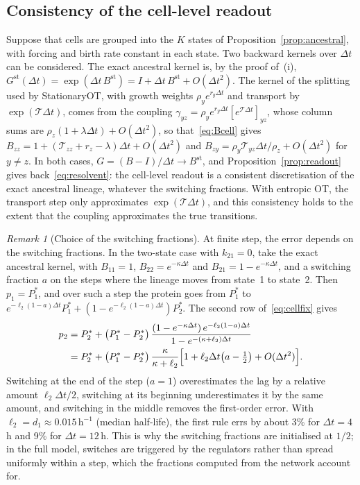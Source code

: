 \documentclass[a4paper, 11pt]{article}
\newcommand{\Tg}{\mathcal{T}}
\theoremstyle{plain}
\theoremstyle{remark}
\newtheorem{rem}{Remark}
\begin{document}
\subsection{Consistency of the cell-level readout}\label{sup:consistency}

Suppose that cells are grouped into the $K$ states of Proposition~\ref{prop:ancestral}, with forcing and birth rate constant in each state. Two backward kernels over $\Delta t$ can be considered. The exact ancestral kernel is, by the proof of~(i), $G^{\mathrm{st}}(\Delta t) = \exp(\Delta t\,B^{\mathrm{st}}) = I + \Delta t\,B^{\mathrm{st}} + O(\Delta t^2)$. The kernel of the splitting used by StationaryOT, with growth weights $\rho_y e^{r_y\Delta t}$ and transport by $\exp(\Tg\Delta t)$, comes from the coupling $\gamma_{yz} = \rho_y e^{r_y\Delta t}[e^{\Tg\Delta t}]_{yz}$, whose column sums are $\rho_z(1 + \lambda\Delta t) + O(\Delta t^2)$, so that~\eqref{eq:Bcell} gives $B_{zz} = 1 + (\Tg_{zz} + r_z - \lambda)\Delta t + O(\Delta t^2)$ and $B_{zy} = \rho_y\Tg_{yz}\Delta t/\rho_z + O(\Delta t^2)$ for $y \neq z$. In both cases, $G = (B - I)/\Delta t \to B^{\mathrm{st}}$, and Proposition~\ref{prop:readout} gives back~\eqref{eq:resolvent}: the cell-level readout is a consistent discretisation of the exact ancestral lineage, whatever the switching fractions. With entropic OT, the transport step only approximates $\exp(\Tg\Delta t)$, and this consistency holds to the extent that the coupling approximates the true transitions.

\begin{rem}[Choice of the switching fractions]\label{rem:switch}
At finite step, the error depends on the switching fractions. In the two-state case with $k_{21} = 0$, take the exact ancestral kernel, with $B_{11} = 1$, $B_{22} = e^{-\kappa\Delta t}$ and $B_{21} = 1 - e^{-\kappa\Delta t}$, and a switching fraction $a$ on the steps where the lineage moves from state~1 to state~2. Then $p_1 = P^\ast_1$, and over such a step the protein goes from $P^\ast_1$ to $e^{-\ell_2(1-a)\Delta t}P^\ast_1 + (1 - e^{-\ell_2(1-a)\Delta t})P^\ast_2$. The second row of~\eqref{eq:cellfix} gives
\begin{align*}
p_2 &= P^\ast_2 + \bigl(P^\ast_1 - P^\ast_2\bigr)\,\frac{(1 - e^{-\kappa\Delta t})\,e^{-\ell_2(1-a)\Delta t}}{1 - e^{-(\kappa + \ell_2)\Delta t}}\\
&= P^\ast_2 + \bigl(P^\ast_1 - P^\ast_2\bigr)\,\frac{\kappa}{\kappa + \ell_2}\Bigl[1 + \ell_2\Delta t\bigl(a - \tfrac12\bigr) + O(\Delta t^2)\Bigr].
\end{align*}
Switching at the end of the step ($a = 1$) overestimates the lag by a relative amount $\ell_2\Delta t/2$, switching at its beginning underestimates it by the same amount, and switching in the middle removes the first-order error. With $\ell_2 = d_1 \approx 0.015\,\mathrm{h}^{-1}$ (median half-life), the first rule errs by about 3\% for $\Delta t = 4$\,h and 9\% for $\Delta t = 12$\,h. This is why the switching fractions are initialised at $1/2$; in the full model, switches are triggered by the regulators rather than spread uniformly within a step, which the fractions computed from the network account for.
\end{rem}
\end{document}

